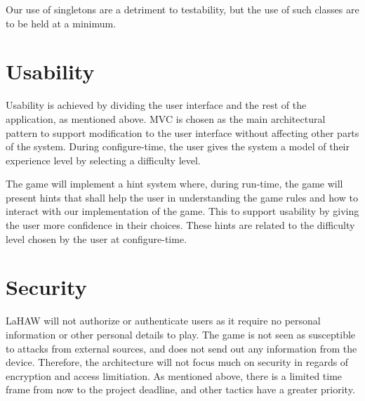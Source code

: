     Our use of singletons are a detriment to testability, but the use of such classes are to be held at a minimum.
    
    \section{Usability}
    Usability is achieved by dividing the user interface and the rest of the application, as mentioned above. MVC is chosen as the main architectural pattern to support modification to the user interface without affecting other parts of the system. During configure-time, the user gives the system a model of their experience level by selecting a difficulty level.
    
    The game will implement a hint system where, during run-time, the game will present hints that shall help the user in understanding the game rules and how to interact with our implementation of the game. This to support usability by giving the user more confidence in their choices.  These hints are related to the difficulty level chosen by the user at configure-time.
    
    \section{Security}
    LaHAW will not authorize or authenticate users as it require no personal information or other personal details to play. The game is not seen as susceptible to attacks from external sources, and does not send out any information from the device. Therefore, the architecture will not focus much on security in regards of encryption and access limitiation. As mentioned above, there is a limited time frame from now to the project deadline, and other tactics have a greater priority.